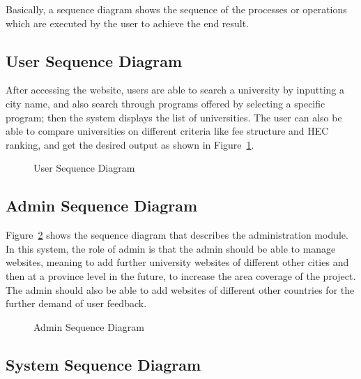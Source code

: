 Basically, a sequence diagram shows the sequence of the processes or operations which are executed by the user to achieve the end result.

\subsection{User Sequence Diagram}

After accessing the website, users are able to search a university by inputting a city name, and also search through programs offered by selecting a specific program; then the system displays the list of universities. The user can also be able to compare universities on different criteria like fee structure and HEC ranking, and get the desired output as shown in Figure~\ref{fig:user_seq}.

\begin{figure}[H]
    \centering
    \caption{User Sequence Diagram}
    \label{fig:user_seq}
\end{figure}

\subsection{Admin Sequence Diagram}

Figure~\ref{fig:admin_seq} shows the sequence diagram that describes the administration module. In this system, the role of admin is that the admin should be able to manage websites, meaning to add further university websites of different other cities and then at a province level in the future, to increase the area coverage of the project. The admin should also be able to add websites of different other countries for the further demand of user feedback.

\begin{figure}[H]
    \centering
    \caption{Admin Sequence Diagram}
    \label{fig:admin_seq}
\end{figure}

\subsection{System Sequence Diagram}

